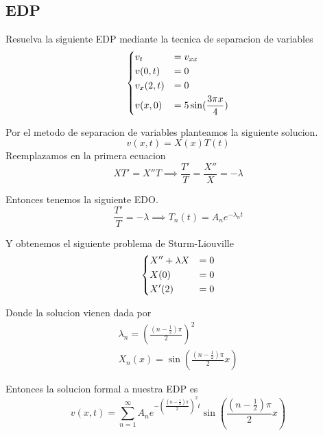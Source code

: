 \documentclass[../main.tex]{subfiles}
\begin{document}
\subsection{EDP}
\begin{problem}
  Resuelva la siguiente EDP mediante la tecnica de separacion de variables
  \begin{equation*}
    \begin{dcases}
      v_{t} &= v_{xx}\\
      v(0, t) &= 0\\
      v_{x}(2, t) &= 0\\
      v(x, 0) &= 5 \sin(\frac{3\pi x}{4})
    \end{dcases}
  \end{equation*}
\end{problem}
\begin{solution}
  Por el metodo de separacion de variables planteamos la siguiente solucion.
  \begin{equation*}
    v(x, t) = X(x)T(t)
  \end{equation*}
  Reemplazamos en la primera ecuacion
  \begin{equation*}
    XT' = X''T \implies \frac{T'}{T} = \frac{X''}{X} = - \lambda
  \end{equation*}

  Entonces tenemos la siguiente EDO.
  \begin{equation*}
    \frac{T'}{T} = -\lambda \implies T_{n}(t) = A_{n}e^{-\lambda_{n} t}
  \end{equation*}

  Y obtenemos el siguiente problema de Sturm-Liouville
  \begin{equation*}
    \begin{dcases}
      X'' + \lambda X &= 0\\
      X(0) &= 0\\
      X'(2) &= 0
    \end{dcases}
  \end{equation*}

  Donde la solucion vienen dada por
  \begin{gather*}
    \lambda_{n} = (\frac{(n - \frac12)\pi}{2})^{2}\\
    X_{n}(x) = \sin(\frac{(n - \frac12)\pi}{2} x)
  \end{gather*}

  Entonces la solucion formal a nuestra EDP es
  \begin{equation*}
    v(x, t) = \sum_{n = 1}^{\infty} A_{n}e^{-(\frac{(n - \frac12)\pi}{2})^{2} t} \sin(\frac{(n - \frac12)\pi}{2} x)
  \end{equation*}


\end{solution}
\end{document}
